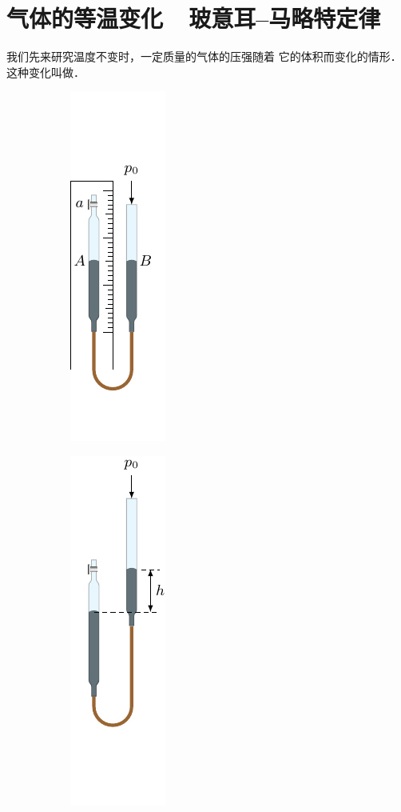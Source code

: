 \section{气体的等温变化~~玻意耳--马略特定律}
我们先来研究温度不变时，一定质量的气体的压强随着
它的体积而变化的情形．这种变化叫做．
\begin{figure}[htbp]
    \centering
    \begin{subfigure}{0.3\linewidth}
        \centering
        \includegraphics{fig/B/3-5a.pdf}
        \caption{}\label{fig_B_3-5a}
    \end{subfigure}
    \hfil
    \begin{subfigure}{0.3\linewidth}
        \centering
        \includegraphics{fig/B/3-5b.pdf}

\end{subfigure}
\end{figure}
